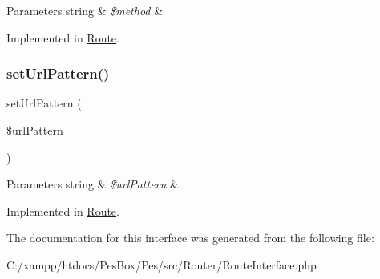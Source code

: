\begin{DoxyParams}[1]{Parameters}
string & {\em \$method} & \\
\hline
\end{DoxyParams}


Implemented in \mbox{\hyperlink{class_pes_1_1_router_1_1_route_a643c65610f8b3179a8c147cab7cbb652}{Route}}.

\mbox{\label{interface_pes_1_1_router_1_1_route_interface_af41294828fa9f8f8d45605c7f5046f83}} 
\subsubsection{\texorpdfstring{set\+Url\+Pattern()}{setUrlPattern()}}
{\footnotesize\ttfamily set\+Url\+Pattern (\begin{DoxyParamCaption}\item[{}]{\$url\+Pattern }\end{DoxyParamCaption})}


\begin{DoxyParams}[1]{Parameters}
string & {\em \$url\+Pattern} & \\
\hline
\end{DoxyParams}


Implemented in \mbox{\hyperlink{class_pes_1_1_router_1_1_route_af41294828fa9f8f8d45605c7f5046f83}{Route}}.



The documentation for this interface was generated from the following file\+:\begin{DoxyCompactItemize}
\item 
C\+:/xampp/htdocs/\+Pes\+Box/\+Pes/src/\+Router/Route\+Interface.\+php\end{DoxyCompactItemize}
